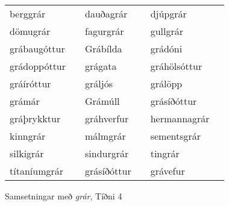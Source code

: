 \documentclass[../samsetningasafn.tex]{subfiles}
\begin{document}
\begin{wordlist}[H]
\begin{tcolorbox}
	\setlength{\extrarowheight}{3pt}
	\begin{tabular}{BlBlBl}	
		berggrár		& 		& 		
		dauðagrár	& 		& 		
		djúpgrár		& 		\\ 		
		dömugrár	& 		& 		
		fagurgrár	&		& 		
		gullgrár		&		\\ 		
		grábaugóttur &		& 		
		Grábílda		&		& 		
		grádóni		&		\\ 		
		grádoppóttur &		& 		
		grágata		&		& 		
		gráhölsóttur	&		\\ 	
		gráíróttur	& 		& 	
		gráljós		&		& 	
		grálöpp		&		\\ 		
		grámár		&		& 	
		Grámúll		&		& 		
		grásíðóttur	&		\\ 	
		gráþrykktur	& 		& 	
		gráhverfur	& 		& 	
		hermannagrár &		\\ 	
		kinngrár		&		& 		
		málmgrár	&		& 	
		sementsgrár &		\\ 		
		silkigrár		&		& 	
		sindurgrár	&		& 	
		tingrár		&		\\ 	
		títaníumgrár	&		& 		
		grásíðóttur	&		& 		
		grávefur		&					
	\end{tabular}

\end{tcolorbox}
	\caption{Samsetningar með \textit{grár}, Tíðni 4}
	\label{listi:gratt.4}
\end{wordlist}
\end{document}
